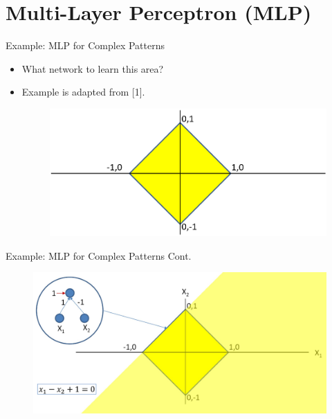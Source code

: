 \documentclass[serif, aspectratio=169]{beamer}
\begin{document}
%
\section{Multi-Layer Perceptron (MLP)}

\begin{frame}{Example: MLP for Complex Patterns}
    \begin{itemize}
        \item What network to learn this area?
        \item Example is adapted from [1].
        \begin{figure}[htpb]
        \begin{center}
            \includegraphics[keepaspectratio, scale=0.25]{pic/2/ex1.png}
        \end{center}
    \end{figure}
    \end{itemize}
\end{frame}


\begin{frame}{Example: MLP for Complex Patterns Cont.}
        \begin{figure}[htpb]
        \begin{center}
            \includegraphics[keepaspectratio, scale=0.25]{pic/2/ex2.png}
        \end{center}
    \end{figure}
\end{frame}
\end{document}

